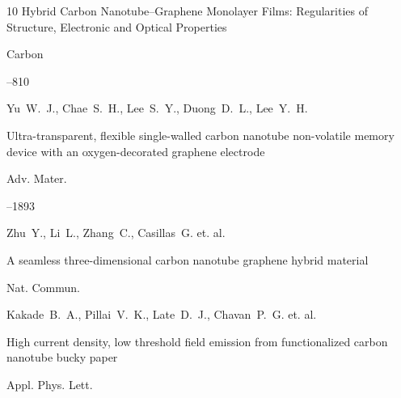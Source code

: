 \begin{thebibliography}{10}
\paper Hybrid Carbon Nanotube–Graphene Monolayer Films: Regularities of Structure, Electronic and Optical Properties

\jour Carbon



--810







\by Yu~W.~J., Chae~S.~H., Lee~S.~Y., Duong~D.~L., Lee~Y.~H.

\paper Ultra-transparent, flexible single-walled carbon nanotube non-volatile memory device with an oxygen-decorated graphene electrode

\jour Adv. Mater.




--1893







\by Zhu~Y., Li~L., Zhang~C., Casillas~G. et. al.

\paper A seamless three-dimensional carbon nanotube graphene hybrid material

\jour Nat. Commun.










\by Kakade~B.~A., Pillai~V.~K., Late~D.~J., Chavan~P.~G. et. al.

\paper High current density, low threshold field emission from functionalized carbon nanotube bucky paper

\jour Appl. Phys. Lett.









\end{thebibliography}

